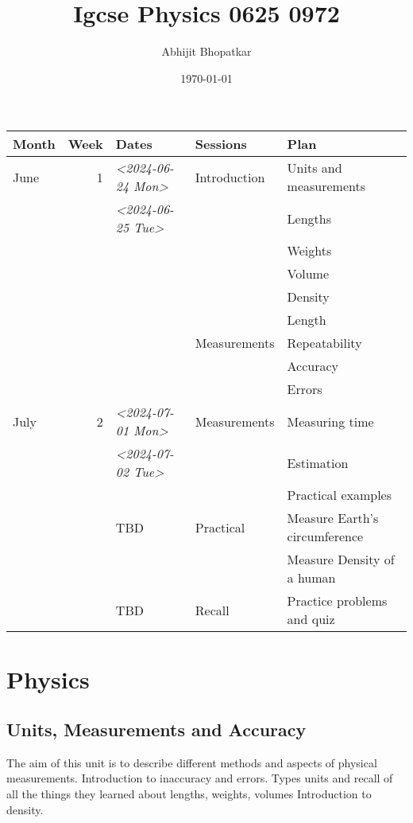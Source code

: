 \documentclass[11pt]{article}
\author{Abhijit Bhopatkar}
\date{\today}
\title{Igcse Physics 0625 0972}
\begin{document}
\maketitle
\tableofcontents

\begin{center}
\begin{tabular}{lrlll}
\hline
Month & Week & Dates & Sessions & Plan\\[0pt]
\hline
June & 1 & \textit{<2024-06-24 Mon>} & Introduction & Units and measurements\\[0pt]
 &  & \textit{<2024-06-25 Tue>} &  & Lengths\\[0pt]
 &  &  &  & Weights\\[0pt]
 &  &  &  & Volume\\[0pt]
 &  &  &  & Density\\[0pt]
 &  &  &  & Length\\[0pt]
 &  &  & Measurements & Repeatability\\[0pt]
 &  &  &  & Accuracy\\[0pt]
 &  &  &  & Errors\\[0pt]
\hline
July & 2 & \textit{<2024-07-01 Mon>} & Measurements & Measuring time\\[0pt]
 &  & \textit{<2024-07-02 Tue>} &  & Estimation\\[0pt]
 &  &  &  & Practical examples\\[0pt]
\hline
 &  & TBD & Practical & Measure Earth's circumference\\[0pt]
 &  &  &  & Measure Density of a human\\[0pt]
\hline
 &  & TBD & Recall & Practice problems and quiz\\[0pt]
\hline
\end{tabular}
\end{center}


\section{Physics}
\label{sec:org17f8b96}
\subsection{Units, Measurements and Accuracy}
\label{sec:orgbcff223}
The aim of this unit is to describe different methods and aspects of physical measurements.
Introduction to inaccuracy and errors. Types units and recall of all the things they learned about lengths, weights, volumes
Introduction to density.
\end{document}
